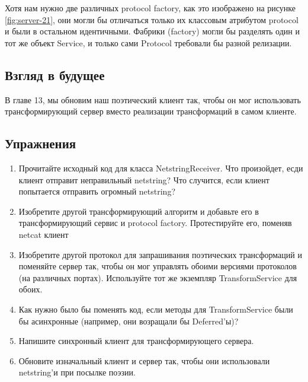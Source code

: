 Хотя нам нужно две различных protocol factory, как это 
изображено на рисунке \ref{fig:server-21}, они могли бы отличаться 
только их классовым атрибутом protocol и были в остальном 
идентичными. Фабрики (factory) могли бы  
разделять один и тот же объект Service, и только сами Protocol требовали 
бы разной релизации.


\subsection{Взгляд в будущее}


В главе 13, мы обновим наш поэтический клиент так, чтобы он мог использовать 
трансформирующий сервер вместо реализации трансформаций в самом 
клиенте. 

\subsection{Упражнения}

\begin{enumerate}

\item Прочитайте исходный код для класса NetstringReceiver. Что 
произойдет, есди клиент отправит неправильный netstring? Что 
случится, если клиент попытается отправить огромный netstring?

\item Изобретите другой трансформирующий алгоритм и добавьте его в 
трансформирующий сервис и protocol factory. Протестируйте его, поменяв 
netcat клиент

\item Изобретите другой протокол для запрашивания поэтических 
трансформаций и поменяйте сервер так, чтобы он мог управлять 
обоими версиями протоколов (на различных портах). Используйте 
тот же экземпляр TransformService для обоих.

\item Как нужно было бы поменять код, если методы 
для TransformService были бы асинхронные (например, они возращали бы Deferred'ы)? 

\item Напишите синхронный клиент для трансформирующего сервера.

\item Обновите изначальный клиент и сервер так, чтобы они использовали 
netstring'и при посылке поэзии. 

\end{enumerate}

